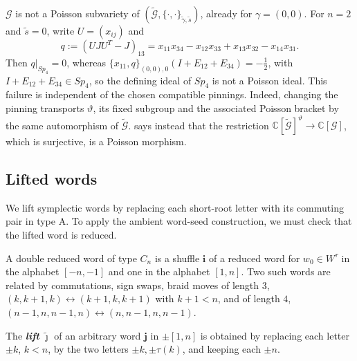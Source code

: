 \documentclass[a4paper]{amsart}
\numberwithin{equation}{section}
\theoremstyle{definition}
\theoremstyle{remark}
\newcommand{\bbC}{\mathbb{C}}
\newcommand{\mcG}{\mathcal{G}}
\newcommand{\bfi}{\mathbf{i}}
\newcommand{\bfj}{\mathbf{j}}
\newcommand{\tG}{\widetilde{\mcG}}
\newcommand{\tg}{\widetilde{\gamma}}
\newcommand{\vt}{\vartheta}
\newcommand{\newword}[1]{\textbf{\emph{#1}}}
\begin{document}
\begin{remark}
  \label{rmk: not Poisson subvariety}
  $\mcG$ is not a Poisson subvariety of $(\tG,\{\cdot,\cdot\}_{\tg,\widetilde{s}})$, already for $\gamma=(0,0)$.
  For $n=2$ and $\widetilde{s}=0$, write $U=(x_{ij})$ and
  \[
    q:=(UJU^T-J)_{13}=x_{11}x_{34}-x_{12}x_{33}+x_{13}x_{32}-x_{14}x_{31}.
  \]
  Then $q|_{Sp_4}=0$, whereas $\{x_{11},q\}_{(0,0),0}(I+E_{12}+E_{34})=-\tfrac12$, with $I+E_{12}+E_{34}\in Sp_4$, so the defining ideal of $Sp_4$ is not a Poisson ideal.
  This failure is independent of the chosen compatible pinnings. Indeed, changing the pinning transports $\vt$, its fixed subgroup and the associated Poisson bracket by the same automorphism of $\tG$.
   says instead that the restriction $\bbC[\tG]^\vt\to\bbC[\mcG]$, which is surjective, is a Poisson morphism.
\end{remark}

\subsection{Lifted words}
We lift symplectic words by replacing each short-root letter with its commuting pair in type A.
To apply the ambient word-seed construction, we must check that the lifted word is reduced.

A double reduced word of type $C_n$ is a shuffle $\bfi$ of a reduced word for $w_0\in W^\tau$ in the alphabet $[-n,-1]$ and one in the alphabet $[1,n]$.
Two such words are related by commutations, sign swaps, braid moves of length $3$, $(k,k+1,k)\leftrightarrow(k+1,k,k+1)$ with $k+1<n$, and of length $4$, $(n-1,n,n-1,n)\leftrightarrow(n,n-1,n,n-1)$.

\begin{definition}
  \label{def: lifted word}
  The \newword{lift} $\widetilde{\boldsymbol{\jmath}}$ of an arbitrary word $\bfj$ in $\pm[1,n]$ is obtained by replacing each letter $\pm k$, $k<n$, by the two letters $\pm k,\pm\tau(k)$, and keeping each $\pm n$.
\end{definition}
\end{document}
